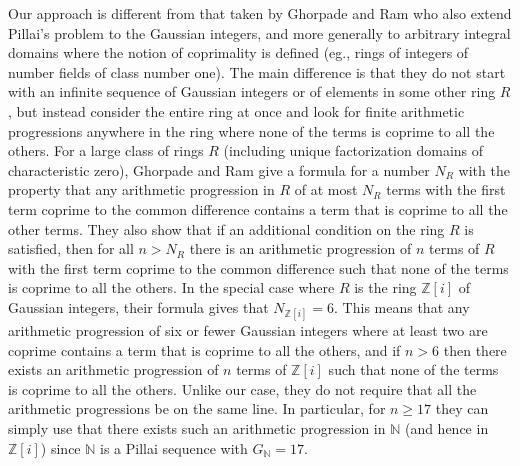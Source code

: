 \documentclass[11pt]{article}
\newcommand{\N}{\mathbb{N}}
\newcommand{\Z}{\mathbb{Z}}
\newcommand{\zi}{\Z[i]}
\begin{document}
Our approach is different from that taken by Ghorpade and Ram \cite{ghorpade} who also extend Pillai's problem to the Gaussian integers, and more generally to  arbitrary integral domains where the notion of coprimality is defined (eg., rings of integers of number fields of class number one).  The main difference is that they do not start with an infinite sequence of Gaussian integers or of elements in some other ring $R$, but instead consider the entire ring at once and look for finite arithmetic progressions anywhere in the ring where none of the terms is coprime to all the others.  For a large class of rings $R$ (including unique factorization domains of characteristic zero), Ghorpade and Ram give a formula for a number $N_R$ with the property that any arithmetic progression in $R$ of at most $N_R$ terms with the first term coprime to the common difference contains a term that is coprime to all the other terms.  They also show that if an additional condition on the ring $R$ is satisfied, then for all $n> N_R$ there is an arithmetic progression of $n$ terms of $R$ with the first term coprime to the common difference such that none of the terms is coprime to all the others.  In the special case where $R$ is the ring $\zi$ of Gaussian integers, their formula gives that $N_{\zi}=6$.  This means that any arithmetic progression of six or fewer Gaussian integers where at least two are coprime contains a term that is coprime to all the others, and if $n>6$ then there exists an arithmetic progression of $n$ terms of $\zi$ such that none of the terms is coprime to all the others. Unlike our case, they do not require that all the arithmetic progressions be on the same line.  In particular,  for $n\geq 17$ they can simply use that there exists such an arithmetic progression in $\N$ (and hence in $\zi$) since $\N$ is a Pillai sequence with $G_\N=17$.
\end{document}
